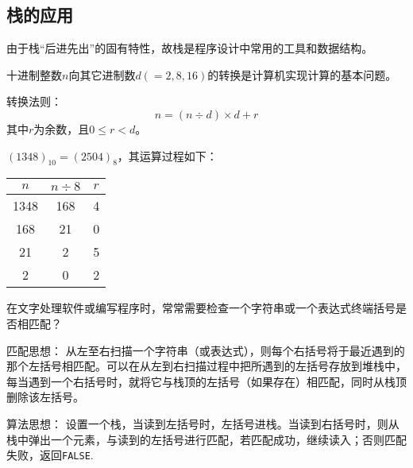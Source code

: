 \subsection{栈的应用}

\begin{frame}\ft{\subsecname}
由于栈“后进先出”的固有特性，故栈是程序设计中常用的工具和数据结构。
\end{frame}

\begin{frame}
十进制整数$n$向其它进制数$d(=2, 8, 16)$的转换是计算机实现计算的基本问题。

\textcolor{acolor5}{转换法则：}
$$
n=(n\div d)\times d+ r
$$
其中$r$为余数，且$0\le r < d$。
\end{frame}

\begin{frame}
\begin{li}
$(1348)_{10}=(2504)_8$，其运算过程如下：
\begin{table}
\begin{tabular}{ccc}\hline
$n$ & $n\div 8$ & $r$\\ \hline
1348 & 168 & 4\\
168  & 21  & 0\\
21   & 2   & 5\\
2    & 0   & 2\\\hline
\end{tabular}
\end{table}
\end{li}
\end{frame}
%
\begin{frame}

\end{frame}
%

\begin{frame}
在文字处理软件或编写程序时，常常需要检查一个字符串或一个表达式终端括号是否相匹配？
\vspace{0.1in}

\pause 
\textcolor{acolor5}{匹配思想：}
从左至右扫描一个字符串（或表达式），则\textcolor{acolor1}{每个右括号将于最近遇到的那个左括号相匹配}。可以在从左到右扫描过程中把所遇到的左括号存放到堆栈中，每当遇到一个右括号时，就将它与栈顶的左括号（如果存在）相匹配，同时从栈顶删除该左括号。  

\end{frame}


\begin{frame}
\textcolor{acolor5}{算法思想：}
设置一个栈，当读到左括号时，左括号进栈。当读到右括号时，则从栈中弹出一个元素，与读到的左括号进行匹配，若匹配成功，继续读入；否则匹配失败，返回{\tt FALSE}.    


\end{frame}

